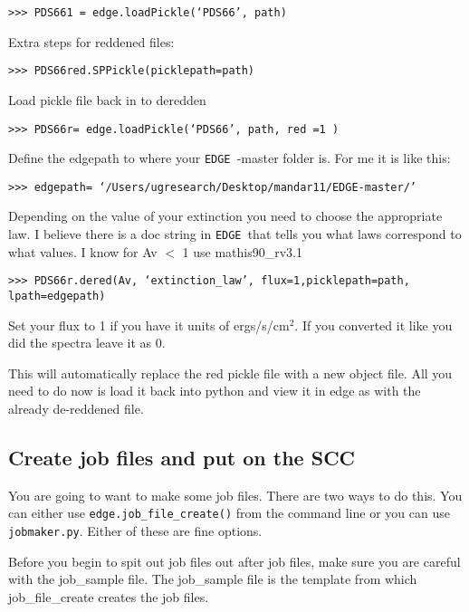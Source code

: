 \documentclass{article}
\newcommand{\edge}{\texttt{EDGE }}
\begin{document}
\vspace{2mm}
\texttt{>>> PDS661 = edge.loadPickle(‘PDS66’, path)}
\vspace{2mm}

Extra steps for reddened files:

\vspace{2mm}
\texttt{>>> PDS66red.SPPickle(picklepath=path)}
\vspace{2mm}

Load pickle file back in to deredden

\vspace{2mm}
\texttt{>>> PDS66r= edge.loadPickle(‘PDS66’, path, red =1 )}
\vspace{2mm}
	
Define the edgepath to where your \edge-master folder is. For me it is like this:

\vspace{2mm}
\texttt{>>> edgepath= ‘/Users/ugresearch/Desktop/mandar11/EDGE-master/’}
\vspace{2mm}	
	 
Depending on the value of your extinction you need to choose the appropriate law. I believe there is a doc string in \edge that tells you what laws correspond to what values. I know for Av $<$ 1 use mathis90\_rv3.1

\vspace{2mm}
\texttt{>>> PDS66r.dered(Av, ‘extinction\_law’, flux=1,picklepath=path, }\\
\texttt{lpath=edgepath) }
\vspace{2mm}

Set your flux to 1 if you have it units of ergs/s/cm$^2$. If you converted it like you did the spectra leave it as 0.

This will automatically replace the red pickle file with a new object file. All you need to do now is load it back into python and view it in edge as with the already de-reddened file. 

\subsection{Create job files and put on the SCC}

You are going to want to make some job files. There are two ways to do this. You can either use \texttt{edge.job\_file\_create()} from the command line or you can use \texttt{jobmaker.py}. Either of these are fine options. 

Before you begin to spit out job files out after job files, make sure you are careful with the job\_sample file. The job\_sample file is the template from which job\_file\_create creates the job files. 
\end{document}
